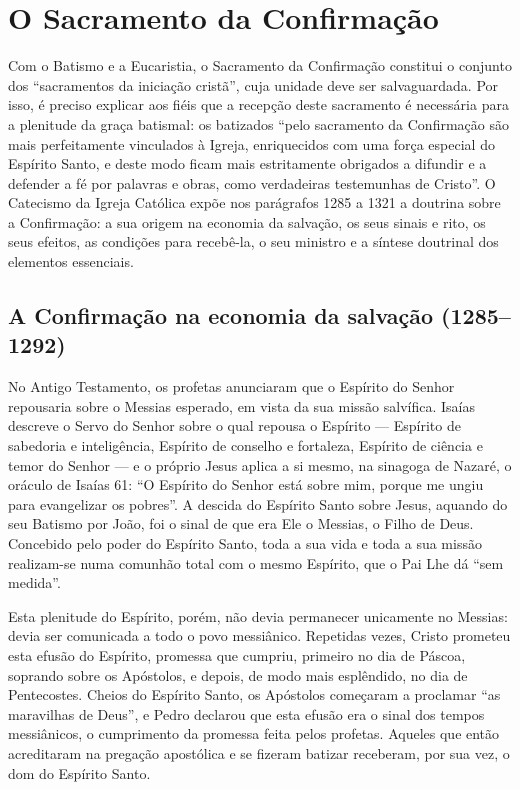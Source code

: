 \chapter{O Sacramento da Confirmação}

Com o Batismo e a Eucaristia, o Sacramento da Confirmação constitui o conjunto dos ``sacramentos da iniciação cristã'', cuja unidade deve ser salvaguardada. Por isso, é preciso explicar aos fiéis que a recepção deste sacramento é necessária para a plenitude da graça batismal: os batizados ``pelo sacramento da Confirmação são mais perfeitamente vinculados à Igreja, enriquecidos com uma força especial do Espírito Santo, e deste modo ficam mais estritamente obrigados a difundir e a defender a fé por palavras e obras, como verdadeiras testemunhas de Cristo''. O Catecismo da Igreja Católica expõe nos parágrafos 1285 a 1321 a doutrina sobre a Confirmação: a sua origem na economia da salvação, os seus sinais e rito, os seus efeitos, as condições para recebê-la, o seu ministro e a síntese doutrinal dos elementos essenciais.

\section{A Confirmação na economia da salvação (1285--1292)}

No Antigo Testamento, os profetas anunciaram que o Espírito do Senhor repousaria sobre o Messias esperado, em vista da sua missão salvífica. Isaías descreve o Servo do Senhor sobre o qual repousa o Espírito --- Espírito de sabedoria e inteligência, Espírito de conselho e fortaleza, Espírito de ciência e temor do Senhor --- e o próprio Jesus aplica a si mesmo, na sinagoga de Nazaré, o oráculo de Isaías 61: ``O Espírito do Senhor está sobre mim, porque me ungiu para evangelizar os pobres''. A descida do Espírito Santo sobre Jesus, aquando do seu Batismo por João, foi o sinal de que era Ele o Messias, o Filho de Deus. Concebido pelo poder do Espírito Santo, toda a sua vida e toda a sua missão realizam-se numa comunhão total com o mesmo Espírito, que o Pai Lhe dá ``sem medida''.

Esta plenitude do Espírito, porém, não devia permanecer unicamente no Messias: devia ser comunicada a todo o povo messiânico. Repetidas vezes, Cristo prometeu esta efusão do Espírito, promessa que cumpriu, primeiro no dia de Páscoa, soprando sobre os Apóstolos, e depois, de modo mais esplêndido, no dia de Pentecostes. Cheios do Espírito Santo, os Apóstolos começaram a proclamar ``as maravilhas de Deus'', e Pedro declarou que esta efusão era o sinal dos tempos messiânicos, o cumprimento da promessa feita pelos profetas. Aqueles que então acreditaram na pregação apostólica e se fizeram batizar receberam, por sua vez, o dom do Espírito Santo.

